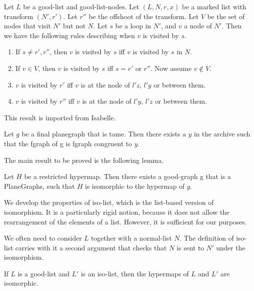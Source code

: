 \begin{lemma}
Let $L$ be a good-list and good-list-nodes.
Let $(L,N,r,x)$ be a marked list with transform $(N',r')$.  Let $r''$ be the offshoot of the transform.
Let $V$ be the set of nodes that visit $N'$ but not $N$.
Let $s$ be a loop in $N'$, and $v$ a node of $N'$.  Then we have the following
rules describing when $v$ is visited by $s$.
\begin{enumerate}
\item If $s\ne r',r''$, then $v$ is visited by $s$ iff $v$ is visited by $s$ in $N$.  
\item If $v\in V$, then $v$ is visited by $s$ iff $s = r'$ or $r''$.  Now assume $v\not\in V$.
\item $v$ is visited by $r'$ iff $v$ is at the node of $l'z$, $l'y$ or between them.
\item $v$ is visited by $r''$ iff $v$ is at the node of $l'y$, $l'z$ or between them.
\end{enumerate}
\end{lemma}



This result is imported from Isabelle.

\begin{theorem}  Let $g$ be a final
planegraph that is tame.  Then there exists a $y$ in the archive such
that the fgraph of g is fgraph congruent to $y$.
\end{theorem}

The main result to be proved is the following lemma.

\begin{lemma}[LSKOKJE]  Let $H$ be a restricted hypermap.  Then there exists a good-graph g that is a PlaneGraphs,
such that $H$ is isomorphic to the hypermap of $g$.
\end{lemma}



We develop the properties of iso-list, which is the list-based version of isomorphism.
It is a particularly rigid notion, because it does not allow the rearrangement of the elements of a list.
However, it is sufficient for our purposes.

We often need to consider $L$ together with a normal-list $N$.  The definition of iso-list carries with it
a second argument that checks that $N$ is sent to $N'$ under the isomorphism.

\begin{lemma}
If $L$ is a good-list and $L'$ is an iso-list, then the hypermaps of $L$ and $L'$ are isomorphic.
\end{lemma}

